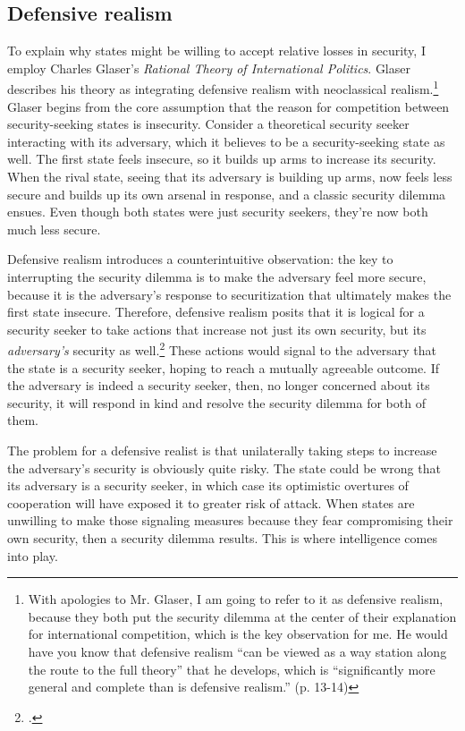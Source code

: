 \documentclass[14pt]{extarticle}
\begin{document}
\subsection{Defensive realism}
To explain why states might be willing to accept relative losses in security, I employ Charles Glaser's \emph{Rational Theory of International Politics}. Glaser describes his theory as integrating defensive realism with neoclassical realism.\footnote{With apologies to Mr. Glaser, I am going to refer to it as defensive realism, because they both put the security dilemma at the center of their explanation for international competition, which is the key observation for me. He would have you know that defensive realism ``can be viewed as a way station along the route to the full theory'' that he develops, which is ``significantly more general and complete than is defensive realism.'' (p. 13-14)} Glaser begins from the core assumption that the reason for competition between security-seeking states is insecurity. Consider a theoretical security seeker interacting with its adversary, which it believes to be a security-seeking state as well. The first state feels insecure, so it builds up arms to increase its security. When the rival state, seeing that its adversary is building up arms, now feels less secure and builds up its own arsenal in response, and a classic security dilemma ensues. Even though both states were just security seekers, they're now both much less secure.


Defensive realism introduces a counterintuitive observation: the key to interrupting the security dilemma is to make the adversary feel more secure, because it is the adversary's response to securitization that ultimately makes the first state insecure. Therefore, defensive realism posits that it is logical for a security seeker to take actions that increase not just its own security, but its \emph{adversary's} security as well.\footcite[p.~7]{glaser_rational_2010} These actions would signal to the adversary that the state is a security seeker, hoping to reach a mutually agreeable outcome. If the adversary is indeed a security seeker, then, no longer concerned about its security, it will respond in kind and resolve the security dilemma for both of them.

The problem for a defensive realist is that unilaterally taking steps to increase the adversary's security is obviously quite risky. The state could be wrong that its adversary is a security seeker, in which case its optimistic overtures of cooperation will have exposed it to greater risk of attack. When states are unwilling to make those signaling measures because they fear compromising their own security, then a security dilemma results. This is where intelligence comes into play.
\end{document}
